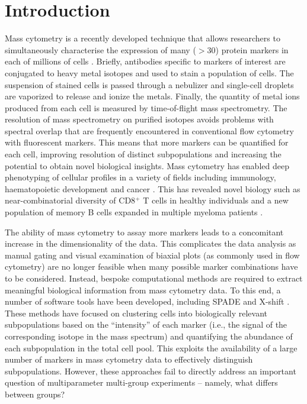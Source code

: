\documentclass{article}
\begin{document}
\section{Introduction}
Mass cytometry is a recently developed technique that allows researchers to simultaneously characterise the expression of many ($>30$) protein markers in each of millions of cells \cite{ornatsky2008study}.
Briefly, antibodies specific to markers of interest are conjugated to heavy metal isotopes and used to stain a population of cells.
The suspension of stained cells is passed through a nebulizer and single-cell droplets are vaporized to release and ionize the metals.
Finally, the quantity of metal ions produced from each cell is measured by time-of-flight mass spectrometry.
The resolution of mass spectrometry on purified isotopes avoids problems with spectral overlap that are frequently encountered in conventional flow cytometry with fluorescent markers.
This means that more markers can be quantified for each cell, improving resolution of distinct subpopulations and increasing the potential to obtain novel biological insights.
Mass cytometry has enabled deep phenotyping of cellular profiles in a variety of fields including immunology, haematopoietic development and cancer \cite{leipold2015multiparameter,leelatian2015characterizing,hansmann2015mass,bendall2011singlecell,newell2012cytometry,levine2015datadriven}.
This has revealed novel biology such as near-combinatorial diversity of CD8$^+$ T cells in healthy individuals \cite{newell2012cytometry} and a new population of memory B cells expanded in multiple myeloma patients \cite{hansmann2015mass}.

The ability of mass cytometry to assay more markers leads to a concomitant increase in the dimensionality of the data.
This complicates the data analysis as manual gating and visual examination of biaxial plots (as commonly used in flow cytometry) are no longer feasible when many possible marker combinations have to be considered.
Instead, bespoke computational methods are required to extract meaningful biological information from mass cytometry data. 
To this end, a number of software tools have been developed, including SPADE \cite{qiu2011extracting} and X-shift \cite{samusik2016automated}.
These methods have focused on clustering cells into biologically relevant subpopulations based on the ``intensity'' of each marker (i.e., the signal of the corresponding isotope in the mass spectrum) and quantifying the abundance of each subpopulation in the total cell pool.
This exploits the availability of a large number of markers in mass cytometry data to effectively distinguish subpopulations.
However, these approaches fail to directly address an important question of multiparameter multi-group experiments -- namely, what differs between groups?
\end{document}
